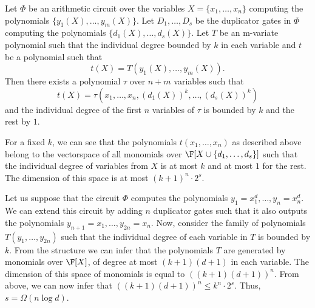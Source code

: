 \begin{lemma}\label{lem:smolensky-gencktb}
  Let $\Phi$ be an arithmetic circuit over the variables $X = \{x_1, \dots, x_n\}$ computing the polynomials $\{y_1(X), \dots, y_m(X)\}$. Let $D_1, \dots, D_s$ be the duplicator gates in $\Phi$ computing the polynomials $\{d_1(X), \dots, d_s(X)\}$. Let $T$ be an m-variate polynomial such that the individual degree bounded by $k$ in each variable and $t$ be a polynomial such that $$ t(X) = T(y_1(X), \dots, y_m(X)). $$ Then there exists a polynomial $\tau$ over $n+m$ variables such that $$t(X) = \tau(x_1, \dots, x_n, (d_1(X))^k, \dots, (d_s(X))^k)$$ and the individual degree of the first $n$ variables of $\tau$ is bounded by $k$ and the rest by $1$. 
\end{lemma}

For a fixed $k$, we can see that the polynomials $t(x_1, \dots, x_n)$ as described above belong to the vectorspace of all monomials over $\F[X\cup\{d_1, \dots, d_s\}]$ such that the individual degree of variables from $X$ is at most $k$ and at most $1$ for the rest. The dimension of this space is at most $(k+1)^n\cdot 2^s$.

Let us suppose that the circuit $\Phi$ computes the polynomials $y_1 = x_1^{d}, \dots, y_n = x_n^{d}$. We can extend this circuit by adding $n$ duplicator gates such that it also outputs the polynomials $y_{n+1} = x_1, \dots, y_{2n} = x_n$. Now, consider the family of polynomials $T(y_1, \dots, y_{2n})$ such that the individual degree of each variable in $T$ is bounded by $k$. From the structure we can infer that the polynomials $T$ are generated by monomials  over $\F[X]$, of degree at most $(k+1)(d+1)$ in each variable. The dimension of this space of monomials is equal to $((k+1)(d+1))^n$. From above, we can now infer that $((k+1)(d+1))^n \leq k^n\cdot 2^s$. Thus, $s = \Omega(n\log d)$.

